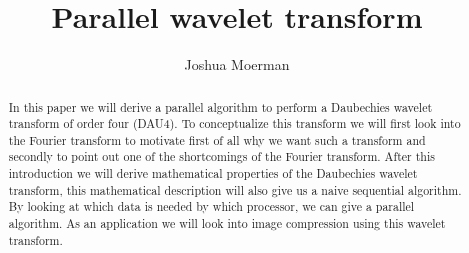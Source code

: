 \documentclass[a4paper, 11pt]{amsart}
\title{Parallel wavelet transform}
\author{Joshua Moerman}
\begin{document}
\begin{abstract}
In this paper we will derive a parallel algorithm to perform a Daubechies wavelet transform of order four (DAU4). To conceptualize this transform we will first look into the Fourier transform to motivate first of all why we want such a transform and secondly to point out one of the shortcomings of the Fourier transform. After this introduction we will derive mathematical properties of the Daubechies wavelet transform, this mathematical description will also give us a naive sequential algorithm. By looking at which data is needed by which processor, we can give a parallel algorithm. As an application we will look into image compression using this wavelet transform.
\end{abstract}
\maketitle
\tableofcontents








\nocite{*}

{}
\end{document}
